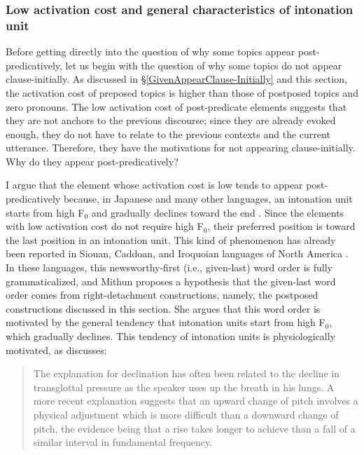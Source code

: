 \subsubsection{Low activation cost and general characteristics of intonation unit}\label{WO:PostP:Motivations:IU}

Before getting directly into the question of
why some topics appear post-predicatively,%
let us begin with the question of why some topics do not appear clause-initially.
As discussed in \S \ref{GivenAppearClause-Initially} and this section,
the activation cost of preposed topics is higher than
those of postposed topics and zero pronouns.
The low activation cost of post-predicate elements suggests that
they are not anchors to the previous discourse;
since they are already evoked enough,
they do not have to relate to the previous contexts and the current utterance.
Therefore, they have the motivations for not appearing clause-initially.
Why do they appear post-predicatively?

I argue that the element whose activation cost is low tends to appear post-predicatively
because, in Japanese and many other languages,
an intonation unit starts from high F$_{0}$ and gradually declines toward the end 
\cite{libermanpierrehumbert84,cruttenden86,duboisetal93,chafe94,prieto96,truckenbrodt04,denetal10}.
Since the elements with low activation cost do not require high F$_{0}$,
their preferred position is toward the last position in an intonation unit.
This kind of phenomenon has already been reported in Siouan, Caddoan, and Iroquoian languages of North America \cite{mithun95}.
In these languages,
this newsworthy-first (i.e., given-last) word order is fully grammaticalized, and Mithun proposes a hypothesis that the given-last word order comes from right-detachment constructions, namely, the postposed constructions discussed in this section.
She argues that this word order is motivated by the general tendency that intonation units start from high F$_{0}$, which gradually declines.
This tendency of intonation units is physiologically motivated,
as  discusses:
%
\begin{quote}
The explanation for declination has often been related to the decline in transglottal pressure as the speaker uses up the breath in his lungs.
A more recent explanation suggests that an upward change of pitch involves a physical adjustment which is more difficult than a downward change of pitch,
the evidence being that a rise takes longer to achieve than a fall of a similar interval in fundamental frequency.
\cite[][168]{cruttenden86}
\end{quote}
%

